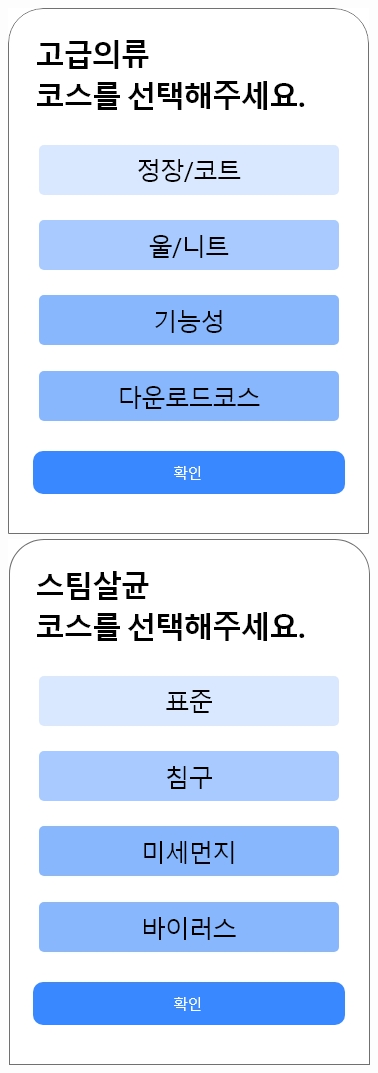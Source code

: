 \documentclass[conference]{IEEEtran}
\begin{document}
\begin{enumerate}
\centerline{\includegraphics[scale=0.3]{assets/고급의류 선택.jpg}
            \includegraphics[scale=0.3]{assets/스팀살균 선택.jpg}} \\ \\

\end{enumerate}
\end{document}
